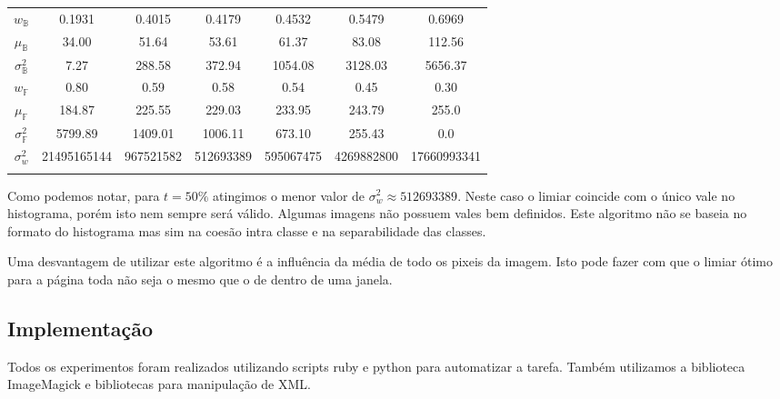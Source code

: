 \documentclass[a4paper,11pt]{article}
\begin{document}
\begin{center}
\begin{table}
\begin{tabular}[p]{@{}ccccccc@{}}
        \\
        $w_\mathbb{B}$ & 0.1931 & 0.4015 & 0.4179 & 0.4532 & 0.5479 & 0.6969 \\

        $\mu_\mathbb{B}$ & 34.00 & 51.64 & 53.61 & 61.37 & 83.08 & 112.56 \\

        $\sigma^{2}_{\mathbb{B}}$ & 7.27 & 288.58 & 372.94 & 1054.08 & 3128.03 & 5656.37 \\

        $w_{\mathbb{F}}$ & 0.80 & 0.59 & 0.58 & 0.54 & 0.45 & 0.30 \\

        $\mu_{\mathbb{F}}$ & 184.87 & 225.55 & 229.03 & 233.95 & 243.79 & 255.0 \\

        $\sigma^{2}_{\mathbb{F}}$ & 5799.89 & 1409.01 & 1006.11 & 673.10 & 255.43 & 0.0 \\

        $\sigma^{2}_{w}$ & 21495165144 & 967521582 & 512693389 & 595067475 & 4269882800 & 17660993341 \\

        \label{tab:otsu}
      \end{tabular}
    \end{table}
    \end{center}

    Como podemos notar, para $t = 50\%$ atingimos o menor valor de $\sigma^{2}_{w} \approx 512693389$. Neste caso o limiar coincide com o único vale no histograma, porém isto nem sempre será válido. Algumas imagens não possuem vales bem definidos. Este algoritmo não se baseia no formato do histograma mas sim na coesão intra classe e na separabilidade das classes.

    Uma desvantagem de utilizar este algoritmo é a influência da média de todo os pixeis da imagem. Isto pode fazer com que o limiar ótimo para a página toda não seja o mesmo que o de dentro de uma janela.

    \subsection{Implementação}

    Todos os experimentos foram realizados utilizando scripts ruby e python para automatizar a tarefa. Também utilizamos a biblioteca ImageMagick e bibliotecas para manipulação de XML.
\end{document}
